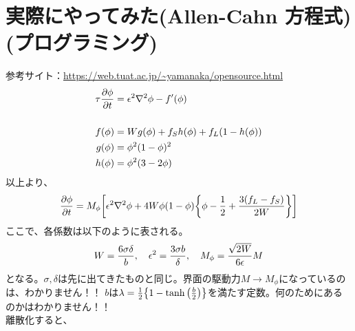 \documentclass[twocolumn,landscape]{ltjsarticle}
\begin{document}
\section{実際にやってみた(Allen-Cahn 方程式)(プログラミング)}
参考サイト：\url{https://web.tuat.ac.jp/~yamanaka/opensource.html}
\begin{equation}
  \begin{split}
    \tau\pdv{\phi}{t}&=\epsilon^2\laplacian\phi-f'(\phi)\\
    \\
    f(\phi)&=W g(\phi)+f_S h(\phi)+f_L(1-h(\phi))\\
    g(\phi)&=\phi^2(1-\phi)^2\\
    h(\phi)&=\phi^2(3-2\phi)
  \end{split}    
\end{equation}
以上より、
\begin{equation}
  \pdv{\phi}{t}=M_\phi\qty[\epsilon^2\laplacian\phi+4W\phi(1-\phi)\qty{\phi-\frac{1}{2}+\frac{3(f_L-f_S)}{2W}}]
\end{equation}
ここで、各係数は以下のように表される。
\begin{equation}
  W=\frac{6\sigma\delta}{b}\qc\epsilon^2=\frac{3\sigma b}{\delta}\qc M_\phi=\frac{\sqrt{2W}}{6\epsilon}M
\end{equation}
となる。$\sigma,\delta$は先に出てきたものと同じ。界面の駆動力$M\rightarrow M_\phi$になっているのは、\color{red}わかりません！！\color{black}
$b$は$\lambda=\frac{1}{2}\qty{1-\tanh\qty(\frac{b}{2})}$を満たす定数。\color{red}何のためにあるのかはわかりません！！\color{black}\\
離散化すると、
\end{document}
